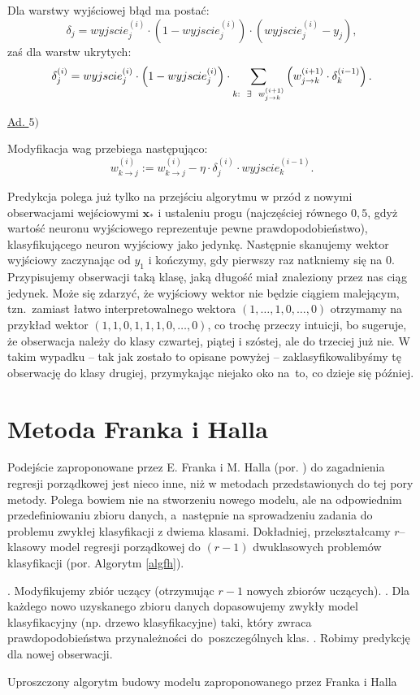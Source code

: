\documentclass{mini}
\begin{document}
Dla warstwy wyjściowej błąd ma postać:
$$
\delta_j = wyjscie_j^{(i)}\cdot \left( 1- wyjscie_j^{(i)} \right)\cdot(wyjscie_j^{(i)} - y_j),
$$
zaś dla warstw ukrytych:
$$
\delta_j^{(i)} =  wyjscie_j^{(i)}\cdot \left( 1- wyjscie_j^{(i)} \right) \cdot \sum_{k:\hspace{2mm}\exists\hspace{2mm} w^{(i+1)}_{j\rightarrow k}} \left( w^{(i+1)}_{j\rightarrow k}\cdot \delta_k^{(i-1)} \right).
$$

\underline{Ad. $5)$}

Modyfikacja wag przebiega następująco:
$$
w_{k\rightarrow j}^{(i)} := w_{k\rightarrow j}^{(i)} - \eta\cdot\delta_j^{(i)}\cdot wyjscie^{(i-1)}_k.
$$

Predykcja polega już tylko na przejściu algorytmu w przód z nowymi obserwacjami wejściowymi $\textbf{x}_{\ast}$ i ustaleniu progu (najczęściej równego $0,5$, gdyż wartość neuronu wyjściowego reprezentuje pewne prawdopodobieństwo), klasyfikującego neuron wyjściowy jako jedynkę. Następnie skanujemy wektor wyjściowy zaczynając od $y_1$ i kończymy, gdy pierwszy raz natkniemy się na $0$. Przypisujemy obserwacji taką klasę, jaką długość miał znaleziony przez nas ciąg jedynek. Może się zdarzyć, że wyjściowy wektor nie będzie ciągiem malejącym, tzn.~zamiast łatwo interpretowalnego wektora $(1,\ldots,1,0,\ldots,0)$ otrzymamy na przykład wektor $(1,1,0,1,1,1,0,\ldots,0)$, co trochę przeczy intuicji, bo sugeruje, że obserwacja należy do klasy czwartej, piątej i szóstej, ale do trzeciej już nie. W takim wypadku -- tak jak zostało to opisane powyżej -- zaklasyfikowalibyśmy tę obserwację do klasy drugiej, przymykając niejako oko na~to, co dzieje się później.  

\section{Metoda Franka i Halla}

Podejście zaproponowane przez E. Franka i M. Halla (por. \cite{fh}) do zagadnienia regresji porządkowej jest nieco inne, niż w metodach przedstawionych do tej pory metody. Polega bowiem nie na stworzeniu nowego modelu, ale na odpowiednim przedefiniowaniu zbioru danych, a~następnie na sprowadzeniu zadania do problemu zwykłej klasyfikacji z dwiema klasami. Dokładniej, przekształcamy $r$--klasowy model regresji porządkowej do $(r-1)$ dwuklasowych problemów klasyfikacji (por. Algorytm \ref{algfh}).

\begin{algorithm}
\begin{algorithmic}
\STATE
{}. Modyfikujemy zbiór uczący (otrzymując $r-1$ nowych zbiorów uczących).
\STATE
{}. Dla każdego nowo uzyskanego zbioru danych dopasowujemy zwykły model klasyfikacyjny (np. drzewo klasyfikacyjne) taki, który zwraca prawdopodobieństwa przynależności do~poszczególnych klas.
\STATE
{}. Robimy predykcję dla nowej obserwacji. 
\end{algorithmic}
\caption{Uproszczony algorytm budowy modelu zaproponowanego przez Franka i Halla}
\label{algfh}
\end{algorithm}
\end{document}
